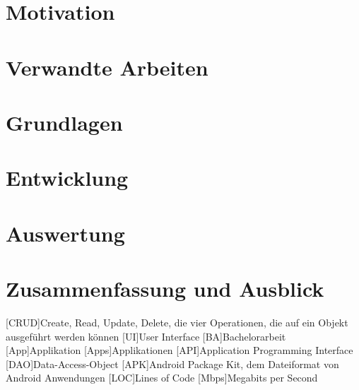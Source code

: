 \documentclass[12pt,a4paper,twosided,openany]{scrbook}
\begin{document}


\mainmatter

\chapter{Motivation}
\label{cha:1_Motivation}

\chapter{Verwandte Arbeiten}

\chapter{Grundlagen}

\chapter{Entwicklung}
\label{cha:4_Entwicklung}

\chapter{Auswertung}

\chapter{Zusammenfassung und Ausblick}




\vfill
\pagebreak

\appendix

{}
\begin{acronym}[KDE]
[CRUD]{Create, Read, Update, Delete, die vier Operationen, die auf ein Objekt ausgeführt werden können}
[UI]{User Interface}
[BA]{Bachelorarbeit}
[App]{Applikation}
[Apps]{Applikationen}
[API]{Application Programming Interface}
[DAO]{Data-Access-Object}
[APK]{Android Package Kit, dem Dateiformat von Android Anwendungen}
[LOC]{Lines of Code}
[Mbps]{Megabits per Second}
\end{acronym}
\vfill
\pagebreak
\end{document}
